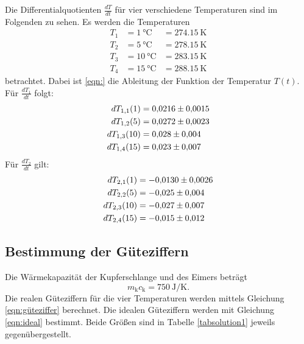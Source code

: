 Die Differentialquotienten $\frac{dT}{dt}$ für vier verschiedene Temperaturen
sind im Folgenden zu sehen. Es werden die Temperaturen
\begin{align*}
    T_1 &= \SI{1}{\degreeCelsius} &= \SI{274.15}{\kelvin} \\ %
    T_2 &= \SI{5}{\degreeCelsius} &= \SI{278.15}{\kelvin}\\
    T_3 &= \SI{10}{\degreeCelsius} &= \SI{283.15}{\kelvin}\\
    T_4 &= \SI{15}{\degreeCelsius} &= \SI{288.15}{\kelvin}
\end{align*}
betrachtet.
Dabei ist \eqref{eqn:} %
die Ableitung der Funktion der Temperatur $T(t)$.
Für $\frac{dT_1}{dt}$ folgt:
\begin{align*}
    dT_{1,1}(1) &= \num{0.0216 \pm 0.0015} \\
    dT_{1,2}(5) &= \num{0.0272 \pm 0.0023} \\
    dT_{1,3}(10) &= \num{0.028 \pm 0.004} \\
    dT_{1,4}(15) &= \num{0.023 \pm 0.007} %
\end{align*}
Für $\frac{dT_2}{dt}$ gilt:
\begin{align*}
    dT_{2,1}(1) &= \num{-0.0130 \pm 0.0026} \\ %
    dT_{2,2}(5) &= \num{-0.025 \pm 0.004} \\
    dT_{2,3}(10) &= \num{-0.027 \pm 0.007} \\
    dT_{2,4}(15) &= \num{-0.015 \pm 0.012}
\end{align*}

\subsection{Bestimmung der Güteziffern}
Die Wärmekapazität der Kupferschlange und des Eimers beträgt
\begin{equation*}
    m_\text{k} c_\text{k} = \SI{750}{\joule\per\kelvin}.
\end{equation*}
Die realen Güteziffern für die vier Temperaturen werden mittels
Gleichung \eqref{eqn:güteziffer} berechnet. %
Die idealen Güteziffern werden mit Gleichung \eqref{eqn:ideal} %
bestimmt.
Beide Größen sind in Tabelle \ref{tabsolution1} jeweils
gegenübergestellt.


